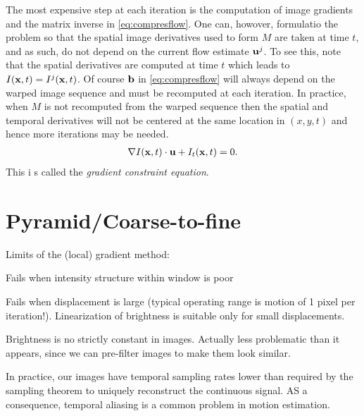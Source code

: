 \begin{compactdesc}
The most expensive step at each iteration is the computation of image gradients and the matrix inverse in \ref{eq:compresflow}. One can, howover, formulatio the problem so that the spatial image derivatives used to form $M$ are taken at time $t$, and as such, do not depend on the current flow estimate $\bm{\mathrm{u}}^j$. To see this, note that the spatial derivatives are computed at time $t$ which leads to $I(\bm{\mathrm{x}},t)=I^j(\bm{\mathrm{x}},t)$. Of course $\bm{\mathrm{b}}$ in \ref{eq:compresflow} will always depend on the warped image sequence and must be recomputed at each iteration. In practice, when $M$ is not recomputed from the warped sequence then the spatial and temporal derivatives will not be centered at the same location in $(x,y,t)$ and hence more iterations may be needed.
\begin{gather*}
	\nabla I(\bm{\mathrm{x}},t)\cdot\bm{\mathrm{u}}+I_t(\bm{\mathrm{x}},t)=0.
\end{gather*}
This i s called the \emph{gradient constraint equation}.
\section{Pyramid/Coarse-to-fine}
Limits of the (local) gradient method:
\begin{enumerate*}[label=\protect\circled{\arabic*},itemjoin=]
	\item Fails when intensity structure within window is poor\\
	\item Fails when displacement is large (typical operating range is motion of 1 pixel per iteration!). Linearization of brightness is suitable only for small displacements. \\
	\item Brightness is no strictly constant in images. Actually less problematic than it appears, since we can pre-filter images to make them look similar.\\
\end{enumerate*}

In practice, our images have temporal sampling rates lower than required by the sampling theorem to uniquely reconstruct the continuous signal. AS a consequence, temporal aliasing is a common problem in motion estimation.


\end{compactdesc}
